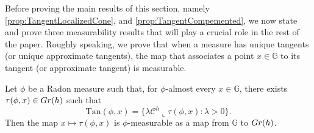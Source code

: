 \documentclass[10pt, a4paper,
oneside, headinclude,footinclude]{scrartcl}
\begin{document}
Before proving the main results of this section, namely \cref{prop:TangentLocalizedCone}, and \cref{prop:TangentCompemented}, we now state and prove three measurability results that will play a crucial role in the rest of the paper. Roughly speaking, we prove that when a measure has unique tangents (or unique approximate tangents), the map that associates a point $x\in\mathbb G$ to its tangent (or approximate tangent) is measurable.

\begin{lemma}\label{lem:BorelTangents3}
Let $\phi$ be a Radon measure such that, for $\phi$-almost every $x\in\mathbb G$, there exists $\tau(\phi,x)\in Gr(h)$ such that
$$
\mathrm{Tan}(\phi,x)=\{\lambda\mathcal{C}^h\llcorner \tau(\phi,x):\lambda>0\}.
$$
Then the map $x\mapsto \tau(\phi,x)$ is $\phi$-measurable as a map from $\mathbb G$ to $Gr(h)$.
\end{lemma}
\end{document}
